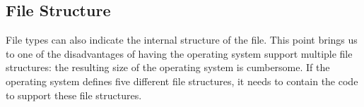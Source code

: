 \subsection{File Structure}\label{subsec:File_Structure}
File types can also indicate the internal structure of the file.
This point brings us to one of the disadvantages of having the operating system support multiple file structures: the resulting size of the operating system is cumbersome.
If the operating system defines five different file structures, it needs to contain the code to support these file structures.


